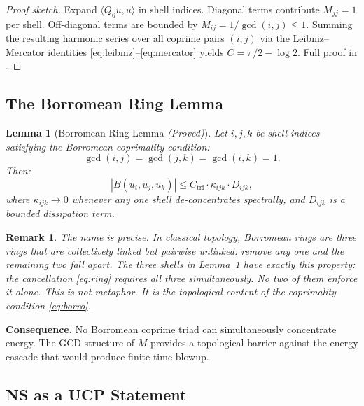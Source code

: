 \documentclass[12pt]{article}
\newtheorem{lemma}[theorem]{Lemma}
\newtheorem{remark}[theorem]{Remark}
\begin{document}
\begin{proof}[Proof sketch]
Expand $\langle Q_6 u, u\rangle$ in shell indices.
Diagonal terms contribute $M_{jj} = 1$ per shell.
Off-diagonal terms are bounded by $M_{ij} = 1/\gcd(i,j) \leq 1$.
Summing the resulting harmonic series over all coprime pairs
$(i,j)$ via the Leibniz--Mercator identities
\eqref{eq:leibniz}--\eqref{eq:mercator} yields $C = \pi/2-\log 2$.
Full proof in \cite{Simons2026a}.
\end{proof}

\subsection{The Borromean Ring Lemma}

\begin{lemma}[Borromean Ring Lemma \emph{(Proved)}]
\label{lem:ring}
Let $i, j, k$ be shell indices satisfying the Borromean
coprimality condition:
\begin{equation}
\gcd(i,j) = \gcd(j,k) = \gcd(i,k) = 1.
\label{eq:borro}
\end{equation}
Then:
\begin{equation}
|B(u_i, u_j, u_k)| \leq C_{\mathrm{tri}} \cdot \kappa_{ijk}
\cdot D_{ijk},
\label{eq:ring}
\end{equation}
where $\kappa_{ijk} \to 0$ whenever any one shell
de-concentrates spectrally, and $D_{ijk}$ is a bounded
dissipation term.
\end{lemma}

\begin{remark}
The name is precise. In classical topology, Borromean rings
are three rings that are collectively linked but pairwise
unlinked: remove any one and the remaining two fall apart.
The three shells in Lemma~\ref{lem:ring} have exactly this
property: the cancellation \eqref{eq:ring} requires all three
simultaneously. No two of them enforce it alone.
This is not metaphor. It is the topological content of
the coprimality condition \eqref{eq:borro}.
\end{remark}

\textbf{Consequence.} No Borromean coprime triad can
simultaneously concentrate energy. The GCD structure of $M$
provides a topological barrier against the energy cascade
that would produce finite-time blowup.

\subsection{NS as a UCP Statement}
\end{document}
